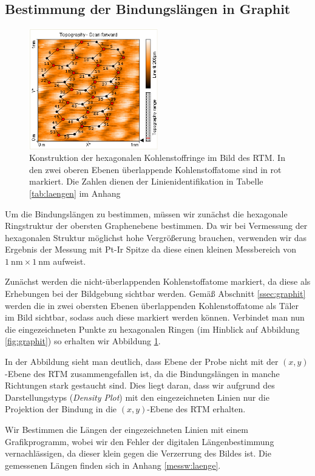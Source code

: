 \documentclass[10pt, a4paper]{article}
\begin{document}
\subsection{Bestimmung der Bindungslängen in Graphit}
\label{ssec:laenge}
\begin{figure}[!h]
\centering
\includegraphics[width=0.5\textwidth]{./grafiken/laenge.png}
\caption{Konstruktion der hexagonalen Kohlenstoffringe im Bild des RTM. In den zwei oberen Ebenen überlappende Kohlenstoffatome sind in rot markiert. Die Zahlen dienen der Linienidentifikation in Tabelle \ref{tab:laengen} im Anhang}
\label{fig:laengen}
\end{figure}
Um die Bindungslängen zu bestimmen, müssen wir zunächst die hexagonale Ringstruktur der obersten Graphenebene bestimmen.
Da wir bei Vermessung der hexagonalen Struktur möglichst hohe Vergrößerung brauchen, verwenden wir das Ergebnis der Messung mit Pt-Ir Spitze da diese einen kleinen Messbereich von $\SI{1}{\nano\metre} \times \SI{1}{\nano\metre}$ aufweist.

Zunächst werden die nicht-überlappenden Kohlenstoffatome markiert, da diese als Erhebungen bei der Bildgebung sichtbar werden.
Gemäß Abschnitt \ref{ssec:graphit} werden die in zwei obersten Ebenen überlappenden Kohlenstoffatome als Täler im Bild sichtbar, sodass auch diese markiert werden können.
Verbindet man nun die eingezeichneten Punkte zu hexagonalen Ringen (im Hinblick auf Abbildung \ref{fig:graphit}) so erhalten wir Abbildung \ref{fig:laengen}.

In der Abbildung sieht man deutlich, dass Ebene der Probe nicht mit der $(x,y)$-Ebene des RTM zusammengefallen ist, da die Bindungslängen in manche Richtungen stark gestaucht sind.
Dies liegt daran, dass wir aufgrund des Darstellungstyps (\emph{Density Plot}) mit den eingezeichneten Linien nur die Projektion der Bindung in die $(x,y)$-Ebene des RTM erhalten.

Wir Bestimmen die Längen der eingezeichneten Linien mit einem Grafikprogramm, wobei wir den Fehler der digitalen Längenbestimmung vernachlässigen, da dieser klein gegen die Verzerrung des Bildes ist.
Die gemessenen Längen finden sich in Anhang \ref{messw:laenge}.
\end{document}
